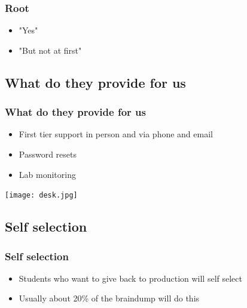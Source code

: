 \documentclass{beamer}
\begin{document}
\frame
{
    \frametitle{Root}
    \begin{itemize}
      \item "Yes" 
      \item "But not at first" 
    \end{itemize}
}

\subsection{What do they provide for us}
\frame
{
    \frametitle{What do they provide for us}
    \begin{itemize}
      \item First tier support in person and via phone and email
      \item Password resets
      \item Lab monitoring
    \end{itemize}
}

\frame
{
        \texttt{[image: desk.jpg]}
}

\subsection{Self selection}
\frame
{
    \frametitle{Self selection}
    \begin{itemize}
      \item Students who want to give back to production will self select
      \item Usually about 20\% of the braindump will do this
    \end{itemize}
}
\end{document}
